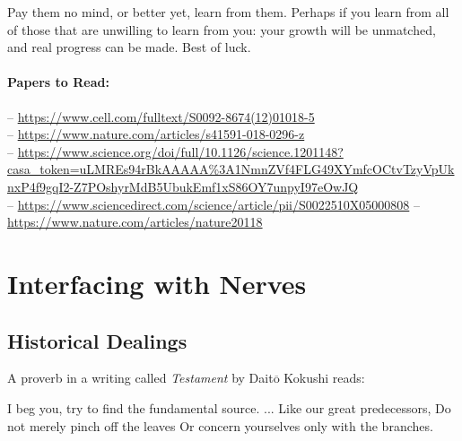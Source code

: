 \documentclass[12pt]{report}
\begin{document}
Pay them no mind, or better yet, learn from them. Perhaps if you learn from all of those that are unwilling to learn from you: your growth will be unmatched, and real progress can be made. Best of luck. 

\subsubsection{Papers to Read:}

-- \url{https://www.cell.com/fulltext/S0092-8674(12)01018-5}\\
-- \url{https://www.nature.com/articles/s41591-018-0296-z}\\
-- \url{https://www.science.org/doi/full/10.1126/science.1201148?casa_token=uLMREs94rBkAAAAA\%3A1NmnZVf4FLG49XYmfcOCtvTzyVpUknxP4f9gqI2-Z7POshyrMdB5UbukEmf1xS86OY7unpyI97eOwJQ}\\
-- \url{https://www.sciencedirect.com/science/article/pii/S0022510X05000808}
-- \url{https://www.nature.com/articles/nature20118}


\chapter{Interfacing with Nerves}

\section{Historical Dealings}

A proverb in a writing called \textit{Testament} by Dait$\overline{\mathrm{o}}$ Kokushi reads:\newline

\hspace*{1cm} I beg you, try to find the fundamental source.\newline
\hspace*{1cm} ...\newline
\hspace*{1cm} Like our great predecessors,\newline 
\hspace*{1cm} Do not merely pinch off the leaves\newline
\hspace*{1cm} Or concern yourselves only with the branches.\newline 
\end{document}
